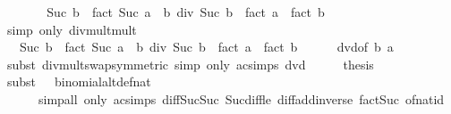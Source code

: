 \begin{isabellebody}
\ \ \isamarkupfalse%
\ \isamarkupfalse%
\ {\isachardoublequoteopen}{\isasymdots}\ {\isacharequal}{\kern0pt}\ Suc\ b\ {\isacharasterisk}{\kern0pt}\ fact\ {\isacharparenleft}{\kern0pt}Suc\ {\isacharparenleft}{\kern0pt}a\ {\isacharplus}{\kern0pt}\ b{\isacharparenright}{\kern0pt}{\isacharparenright}{\kern0pt}\ div\ {\isacharparenleft}{\kern0pt}Suc\ b\ {\isacharasterisk}{\kern0pt}\ {\isacharparenleft}{\kern0pt}fact\ a\ {\isacharasterisk}{\kern0pt}\ fact\ b{\isacharparenright}{\kern0pt}{\isacharparenright}{\kern0pt}{\isachardoublequoteclose}\isanewline
\ \ \ \ \isamarkupfalse%
\ {\isacharparenleft}{\kern0pt}simp\ only{\isacharcolon}{\kern0pt}\ div{\isacharunderscore}{\kern0pt}mult{\isacharunderscore}{\kern0pt}mult{}{\isacharparenright}{\kern0pt}\isanewline
\ \ \isamarkupfalse%
\ \isamarkupfalse%
\ {\isachardoublequoteopen}{\isasymdots}\ {\isacharequal}{\kern0pt}\ Suc\ b\ {\isacharasterisk}{\kern0pt}\ {\isacharparenleft}{\kern0pt}fact\ {\isacharparenleft}{\kern0pt}Suc\ {\isacharparenleft}{\kern0pt}a\ {\isacharplus}{\kern0pt}\ b{\isacharparenright}{\kern0pt}{\isacharparenright}{\kern0pt}\ div\ {\isacharparenleft}{\kern0pt}Suc\ b\ {\isacharasterisk}{\kern0pt}\ {\isacharparenleft}{\kern0pt}fact\ a\ {\isacharasterisk}{\kern0pt}\ fact\ b{\isacharparenright}{\kern0pt}{\isacharparenright}{\kern0pt}{\isacharparenright}{\kern0pt}{\isachardoublequoteclose}\isanewline
\ \ \ \ \isamarkupfalse%
\ dvd{\isacharbrackleft}{\kern0pt}of\ b\ a{\isacharbrackright}{\kern0pt}\ \isamarkupfalse%
\ {\isacharparenleft}{\kern0pt}subst\ div{\isacharunderscore}{\kern0pt}mult{\isacharunderscore}{\kern0pt}swap{\isacharbrackleft}{\kern0pt}symmetric{\isacharbrackright}{\kern0pt}{\isacharsemicolon}{\kern0pt}\ simp\ only{\isacharcolon}{\kern0pt}\ ac{\isacharunderscore}{\kern0pt}simps\ dvd{\isacharparenright}{\kern0pt}\isanewline
\ \ \isamarkupfalse%
\ \isamarkupfalse%
\ {\isacharquery}{\kern0pt}thesis\isanewline
\ \ \ \ \isamarkupfalse%
\ {\isacharparenleft}{\kern0pt}subst\ {\isacharparenleft}{\kern0pt}{}\ {}{\isacharparenright}{\kern0pt}\ binomial{\isacharunderscore}{\kern0pt}altdef{\isacharunderscore}{\kern0pt}nat{\isacharparenright}{\kern0pt}\isanewline
\ \ \ \ \ \ {\isacharparenleft}{\kern0pt}simp{\isacharunderscore}{\kern0pt}all\ only{\isacharcolon}{\kern0pt}\ ac{\isacharunderscore}{\kern0pt}simps\ diff{\isacharunderscore}{\kern0pt}Suc{\isacharunderscore}{\kern0pt}Suc\ Suc{\isacharunderscore}{\kern0pt}diff{\isacharunderscore}{\kern0pt}le\ diff{\isacharunderscore}{\kern0pt}add{\isacharunderscore}{\kern0pt}inverse\ fact{\isacharunderscore}{\kern0pt}Suc\ of{\isacharunderscore}{\kern0pt}nat{\isacharunderscore}{\kern0pt}id{\isacharparenright}{\kern0pt}\isanewline

\end{isabellebody}
